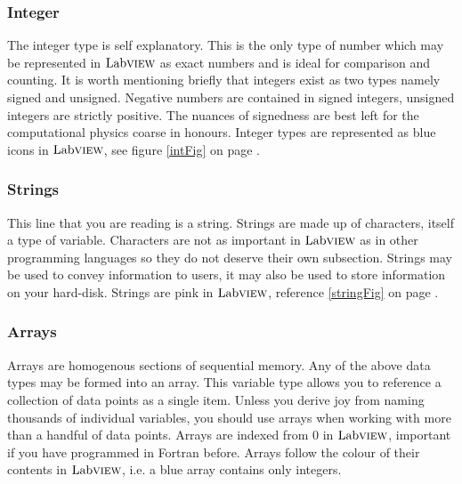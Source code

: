	\subsubsection{Integer}
	The integer type is self explanatory. This is the only type of number which may be represented in $\text{Lab}\textsc{view}$ as exact numbers and is ideal for comparison and counting. It is worth mentioning briefly that integers exist as two types namely signed and unsigned. Negative numbers are contained in signed integers, unsigned integers are strictly positive. The nuances of signedness are best left for the computational physics coarse in honours. Integer types are represented as blue icons in $\text{Lab}\textsc{view}$, see figure \ref{intFig} on page \pageref{intFig}.
	\subsubsection{Strings}
	This line that you are reading is a string. Strings are made up of characters, itself a type of variable. Characters are not as important in $\text{Lab}\textsc{view}$ as in other programming languages so they do not deserve their own subsection. Strings may be used to convey information to users, it may also be used to store information on your hard-disk. Strings are pink in $\text{Lab}\textsc{view}$, reference \ref{stringFig} on page \pageref{stringFig}.
	\subsubsection{Arrays}
	Arrays are homogenous sections of sequential memory. Any of the above data types may be formed into an array. This variable type allows you to reference a collection of data points as a single item. Unless you derive joy from naming thousands of individual variables, you should use arrays when working with more than a handful of data points. Arrays are indexed from 0 in $\text{Lab}\textsc{view}$, important if you have programmed in Fortran before. Arrays follow the colour of their contents in $\text{Lab}\textsc{view}$, i.e. a blue array contains only integers.
